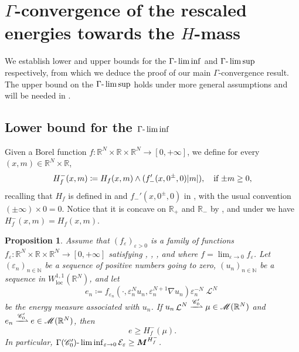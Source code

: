\documentclass[JEP,XML,SOM,Unicode,published]{cedram}
\theoremstyle{plain}
\newtheorem{proposition}[theorem]{Proposition}
\theoremstyle{definition}
\newcommand{\N}{\mathbb{N}}
\newcommand{\R}{\mathbb{R}}
\newcommand{\Cspace}{\mathscr{C}}
\newcommand{\Mspace}{\mathscr{M}}
\newcommand{\ener}{\mathcal{E}}
\newcommand{\mass}{\boldsymbol{M}}
\newcommand{\loc}{\mathrm{loc}}
\newcommand{\eps}{\varepsilon}
\DeclarePairedDelimiter{\abs}{\lvert}{\rvert}
\DeclareMathOperator{\lbm}{\mathcal{L}}
\newcommand{\mweakto}{\xrightharpoonup{\Cspace_0'}}
\begin{document}
\section{\texorpdfstring{$\Gamma$}{Γ}-convergence of the rescaled energies towards the \texorpdfstring{\(H\)-mass}{H-mass}}\label{sectionGammaConvergence}

We establish lower and upper bounds for the $\Gamma\textup{-}\liminf$ and $\Gamma\textup{-}\limsup$ respectively, from which we deduce the proof of our main $\Gamma$-convergence result. The upper bound on the $\Gamma\textup{-}\limsup$ holds under more general assumptions and will be needed in .

\subsection{Lower bound for the \texorpdfstring{\(\Gamma\textup{-}\liminf\)}{Γ-liminf}}

Given a Borel function $f : \R^N \times \R \times \R^N \to [0,+\infty]$, we define for every $(x,m)\in \R^N\times \R$,
\begin{equation}
\label{definitionLowerCost}
H_f^-(x,m) \coloneqq H_f(x,m) \wedge (f'_-(x,0^\pm,0) \abs{m}), \quad\text{if $\pm m\geq 0$},
\end{equation}
recalling that \(H_f\) is defined in  and \(f_{-}'(x,0^\pm,0)\) in , with the usual convention $(\pm\infty) \times 0 = 0$. Notice that it is concave on $\R_+$ and $\R_-$ by , and under  we have \(H_f^-(x,m) =H_f(x,m)\).

\begin{proposition}\label{lowerBound}
Assume that $(f_\eps)_{\eps > 0}$ is a family of functions \(f_\eps:\R^N\times\R\times\R^N\to[0,+\infty]\) satisfying , , ,  and  where $f=\lim_{\eps\to 0} f_\eps$. Let \((\eps_n)_{n\in\N}\) be a sequence of positive numbers going to zero, \((u_n)_{n\in\N}\) be a sequence in \(W^{1,1}_\loc(\R^N)\), and let
\[
e_n \coloneqq f_{\eps_n}(\cdot,\eps_n^N u_{n},\eps_n^{N+1} \nabla u_n)\eps_n^{-N} \lbm^N
\]
be the energy measure associated with $u_n$. If \(u_n\lbm^N\mweakto \mu\in\Mspace(\R^N)\) and $e_n \mweakto e \in \Mspace(\R^N)$, then
\begin{equation}
\label{mainLowerBound}
e \geq H_f^-(\mu).
\end{equation}
In particular, \(\Gamma(\Cspace_0')\textup{-}\liminf_{\eps \to 0} \ener_\eps \geq \mass^{H_f^-}\).
\end{proposition}
\end{document}
